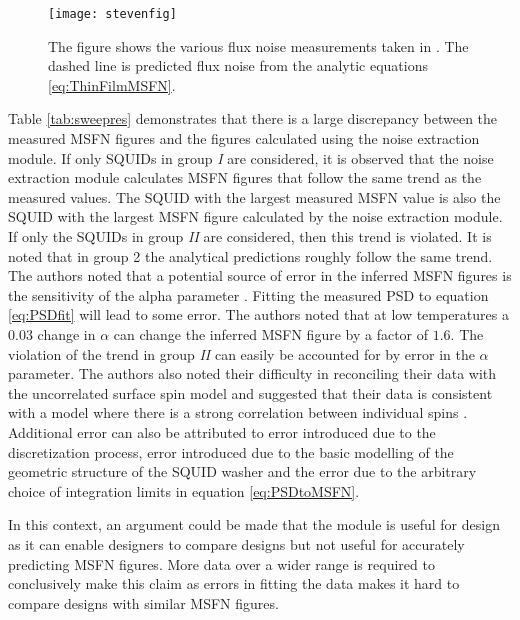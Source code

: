 \begin{figure}[h]
    \centering
    \texttt{[image: stevenfig]}
    \caption{The figure shows the various flux noise measurements taken in \cite{fluxNoiseSquidsStevenAnton}. The dashed line is predicted flux noise from the analytic equations \ref{eq:ThinFilmMSFN}.}
    \label{fig:stevefig}
\end{figure}

Table \ref{tab:sweepres} demonstrates that there is a large discrepancy between the measured MSFN figures and the figures calculated using the noise extraction module. If only SQUIDs in group \textit{I} are considered, it is observed that the noise extraction module calculates MSFN figures that follow the same trend as the measured values. The SQUID with the largest measured MSFN value is also the SQUID with the largest MSFN figure calculated by the noise extraction module. If only the SQUIDs in group \textit{II} are considered, then this trend is violated. It is noted that in group 2 the analytical predictions roughly follow the same trend. The authors noted that a potential source of error in the inferred MSFN figures is the sensitivity of the alpha parameter \cite{fluxNoiseSquidsStevenAnton}. Fitting the measured PSD to equation \ref{eq:PSDfit} will lead to some error. The authors noted that at low temperatures a $0.03$ change in $\alpha$ can change the inferred MSFN figure by a factor of $1.6$. The violation of the trend in group \textit{II} can easily be accounted for by error in the $\alpha$ parameter. The authors also noted their difficulty in reconciling their data with the uncorrelated surface spin model and suggested that their data is consistent with a model where there is a strong correlation between individual spins \cite{fluxNoiseSquidsStevenAnton}. Additional error can also be attributed to error introduced due to the discretization process, error introduced due to the basic modelling of the geometric structure of the SQUID washer and the error due to the arbitrary choice of integration limits in equation \ref{eq:PSDtoMSFN}.  \par

In this context, an argument could be made that the module is useful for design as it can enable designers to compare designs but not useful for accurately predicting MSFN figures. More data over a wider range is required to conclusively make this claim as errors in fitting the data makes it hard to compare designs with similar MSFN figures.